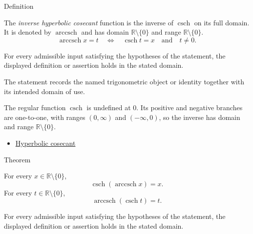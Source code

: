 

\begin{definitionbox}{Definition}
\begin{definition}
\label{def:inverse-hyperbolic-cosecant}
The \emph{inverse hyperbolic cosecant} function is the inverse of
$\operatorname{csch}$ on its full domain. It is denoted by
$\operatorname{arccsch}$ and has domain $\mathbb{R}\setminus\{0\}$ and range
$\mathbb{R}\setminus\{0\}$.
\[
  \operatorname{arccsch} x=t
  \quad\Longleftrightarrow\quad
  \operatorname{csch} t=x
  \quad\text{and}\quad
  t\neq 0.
\]
\end{definition}
\end{definitionbox}
\begin{remark*}
For every admissible input satisfying the hypotheses of the statement, the
displayed definition or assertion holds in the stated domain.
\end{remark*}

\begin{remark*}[Interpretation]
The statement records the named trigonometric object or identity together with
its intended domain of use.
\end{remark*}

\begin{remark*}
The regular function $\operatorname{csch}$ is undefined at $0$. Its positive
and negative branches are one-to-one, with ranges $(0,\infty)$ and
$(-\infty,0)$, so the inverse has domain and range
$\mathbb{R}\setminus\{0\}$.
\end{remark*}
\begin{dependencies}
\begin{itemize}
  \item \hyperref[def:hyperbolic-cosecant]{Hyperbolic cosecant}
\end{itemize}
\end{dependencies}

\begin{theorembox}{Theorem}
\begin{theorem}
\label{thm:inverse-hyperbolic-cosecant-identities}
For every $x\in\mathbb{R}\setminus\{0\}$,
\[
  \operatorname{csch}(\operatorname{arccsch} x)=x.
\]
For every $t\in\mathbb{R}\setminus\{0\}$,
\[
  \operatorname{arccsch}(\operatorname{csch} t)=t.
\]
\end{theorem}
\end{theorembox}
\begin{remark*}
For every admissible input satisfying the hypotheses of the statement, the
displayed definition or assertion holds in the stated domain.
\end{remark*}

